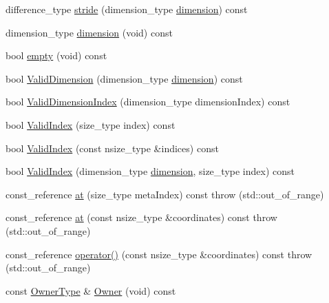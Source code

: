 \begin{DoxyCompactItemize}
difference\-\_\-type \hyperlink{classvct_dynamic_const_n_array_base_ace94a0354f11cf39dfc0d9836cd8122e}{stride} (dimension\-\_\-type \hyperlink{classvct_dynamic_const_n_array_base_aad976ad48dc9b1006d9e2729195f0b7c}{dimension}) const 
\item 
dimension\-\_\-type \hyperlink{classvct_dynamic_const_n_array_base_aad976ad48dc9b1006d9e2729195f0b7c}{dimension} (void) const 
\item 
bool \hyperlink{classvct_dynamic_const_n_array_base_ae2efdcfcdb01a9c89584ffa17a6d79e0}{empty} (void) const 
\item 
bool \hyperlink{classvct_dynamic_const_n_array_base_add7dd207dc8f6b17fcdb44a6a55f6ddb}{Valid\-Dimension} (dimension\-\_\-type \hyperlink{classvct_dynamic_const_n_array_base_aad976ad48dc9b1006d9e2729195f0b7c}{dimension}) const 
\item 
bool \hyperlink{classvct_dynamic_const_n_array_base_a5e268627a6d93defac33b610ae5207e9}{Valid\-Dimension\-Index} (dimension\-\_\-type dimension\-Index) const 
\item 
bool \hyperlink{classvct_dynamic_const_n_array_base_a45461c1a651ec96f94a7206c2ba6a595}{Valid\-Index} (size\-\_\-type index) const 
\item 
bool \hyperlink{classvct_dynamic_const_n_array_base_aec2f79e0e49b707f550ac6de3ec88b3e}{Valid\-Index} (const nsize\-\_\-type \&indices) const 
\item 
bool \hyperlink{classvct_dynamic_const_n_array_base_a6c8729dfaf1070eee13932cd03f95148}{Valid\-Index} (dimension\-\_\-type \hyperlink{classvct_dynamic_const_n_array_base_aad976ad48dc9b1006d9e2729195f0b7c}{dimension}, size\-\_\-type index) const 
\item 
const\-\_\-reference \hyperlink{classvct_dynamic_const_n_array_base_a50afd4908e7af348e03805ba0fa76ffe}{at} (size\-\_\-type meta\-Index) const   throw (std\-::out\-\_\-of\-\_\-range)
\item 
const\-\_\-reference \hyperlink{classvct_dynamic_const_n_array_base_aece110dd998e414779f0d85d9ac3854f}{at} (const nsize\-\_\-type \&coordinates) const   throw (std\-::out\-\_\-of\-\_\-range)
\item 
const\-\_\-reference \hyperlink{classvct_dynamic_const_n_array_base_ab68f2219e064e718aa5698438813c29b}{operator()} (const nsize\-\_\-type \&coordinates) const   throw (std\-::out\-\_\-of\-\_\-range)
\item 
const \hyperlink{classvct_dynamic_const_n_array_base_aad4328d01dc43be4b9047d594ed2ae8d}{Owner\-Type} \& \hyperlink{classvct_dynamic_const_n_array_base_acc00e30d65fefe68b280fb5912791a1f}{Owner} (void) const 

\end{DoxyCompactItemize}
